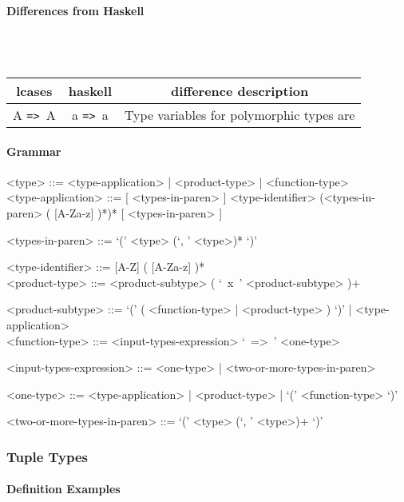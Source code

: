 \documentclass{article}
\def\ra{\texttt{=>}\ }
\def\pend{\mbox{} \\\\}
\begin{document}
\paragraph{Differences from Haskell}\pend
\begin{tabular}{ |c|c|c| } 
\hline
lcases & haskell & difference description \\ 
\hline
\hline
A \ra A & a \ra a & Type variables for polymorphic types are  \\ 
\hline
\end{tabular}

\paragraph{Grammar}
\begin{grammar}
<type> ::= <type-application> | <product-type> | <function-type> \\

<type-application> ::=
[ <types-in-paren> ] <type-identifier> (<types-in-paren> ( [A-Za-z] )*)* [ <types-in-paren> ] 

<types-in-paren> ::= `(' <type> (`, ' <type>)* `)'

<type-identifier> ::= [A-Z] ( [A-Za-z] )* \\ 
 
<product-type> ::= <product-subtype> ( `\ x\ ' <product-subtype> )+

<product-subtype> ::=
`(' ( <function-type> | <product-type> ) `)' | <type-application> \\

<function-type> ::= <input-types-expression> `\ =>\ ' <one-type>

<input-types-expression> ::= <one-type> | <two-or-more-types-in-paren>

<one-type> ::= <type-application> | <product-type> | `(' <function-type> `)'

<two-or-more-types-in-paren> ::=  `(' <type> (`, ' <type>)+ `)'
\end{grammar}

\subsubsection{Tuple Types}
\label{subsubsec:tupts}

\paragraph{Definition Examples}
\end{document}
